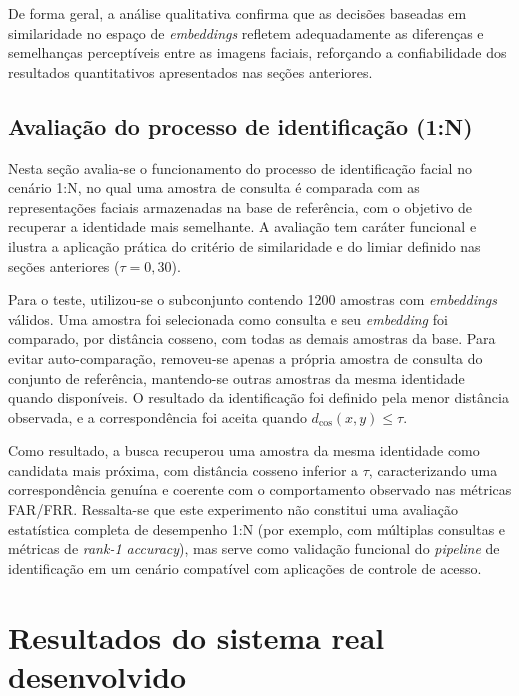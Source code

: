 De forma geral, a análise qualitativa confirma que as decisões baseadas em similaridade no espaço de \textit{embeddings} refletem adequadamente as diferenças e semelhanças perceptíveis entre as imagens faciais, reforçando a confiabilidade dos resultados quantitativos apresentados nas seções anteriores.


\subsection{Avaliação do processo de identificação (1:N)}

Nesta seção avalia-se o funcionamento do processo de identificação facial no cenário 1:N, no qual uma amostra de consulta é comparada com as representações faciais armazenadas na base de referência, com o objetivo de recuperar a identidade mais semelhante. A avaliação tem caráter funcional e ilustra a aplicação prática do critério de similaridade e do limiar definido nas seções anteriores ($\tau = 0{,}30$).

Para o teste, utilizou-se o subconjunto contendo 1200 amostras com \textit{embeddings} válidos. Uma amostra foi selecionada como consulta e seu \textit{embedding} foi comparado, por distância cosseno, com todas as demais amostras da base. Para evitar auto-comparação, removeu-se apenas a própria amostra de consulta do conjunto de referência, mantendo-se outras amostras da mesma identidade quando disponíveis. O resultado da identificação foi definido pela menor distância observada, e a correspondência foi aceita quando $d_{\cos}(x,y)\leq\tau$.

Como resultado, a busca recuperou uma amostra da mesma identidade como candidata mais próxima, com distância cosseno inferior a $\tau$, caracterizando uma correspondência genuína e coerente com o comportamento observado nas métricas \acs{FAR}/\acs{FRR}. Ressalta-se que este experimento não constitui uma avaliação estatística completa de desempenho 1:N (por exemplo, com múltiplas consultas e métricas de \textit{rank-1 accuracy}), mas serve como validação funcional do \textit{pipeline} de identificação em um cenário compatível com aplicações de controle de acesso.




\section{Resultados do sistema real desenvolvido}

